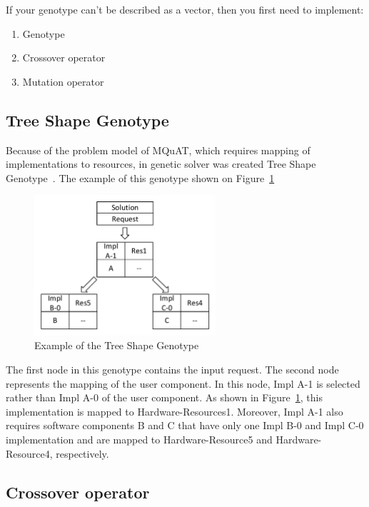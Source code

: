 If your genotype can't be described as a vector, then you first need to implement:

\begin{enumerate}
	\item Genotype
	\item Crossover operator
	\item Mutation operator
\end{enumerate}

\subsection{Tree Shape Genotype}

Because of the problem model of MQuAT, which requires mapping of implementations to resources, in genetic solver was created Tree Shape Genotype~\cite{ahmad18}.
The example of this genotype shown on Figure~\ref{fig:TreeShapeGenotypeExample}

\begin{figure}
	\centering
	\includegraphics[width=0.6\textwidth]{images/TreeShapeGenotypeExample.pdf}
	\caption[Example of the Tree Shape Genotype]{Example of the Tree Shape Genotype}
	\label{fig:TreeShapeGenotypeExample}
\end{figure}

The first node in this genotype contains the input request. The second node represents the mapping of the user component. In this node, Impl A-1 is selected rather than Impl A-0 of the user component. As shown in Figure~\ref{fig:TreeShapeGenotypeExample}, this implementation is mapped to Hardware-Resources1. Moreover, Impl A-1 also requires software components B and C that have only one Impl B-0 and Impl C-0 implementation and are mapped to Hardware-Resource5 and Hardware-Resource4, respectively.

\subsection{Crossover operator}
\label{sec:GeneticSolverCrossover}

